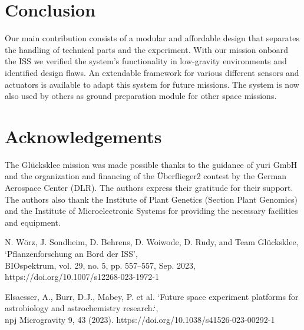 \documentclass{scrartcl}
\begin{document}
\section*{Conclusion}
Our main contribution consists of a modular and affordable design that separates the handling of technical parts and the experiment.
With our mission onboard the ISS we verified the system's functionality in low-gravity environments and identified design flaws.
An extendable framework for various different sensors and actuators is available to adapt this system for future missions.
The system is now also used by others as ground preparation module for other space missions.


\section*{Acknowledgements}
The Glücksklee mission was made possible thanks to the guidance of yuri GmbH and the organization and financing of the Überflieger2 contest by the German Aerospace Center (DLR). The authors express their gratitude for their support.
The authors also thank the Institute of Plant Genetics (Section Plant Genomics) and the Institute of Microelectronic Systems for providing the necessary facilities and equipment.


\begin{thebibliography}{99}
       N. Wörz, J. Sondheim, D. Behrens, D. Woiwode, D. Rudy, and Team Glücksklee, ‘Pflanzenforschung an Bord der ISS’, \\ BIOspektrum, vol. 29, no. 5, pp. 557–557, Sep. 2023, https://doi.org/10.1007/s12268-023-1972-1

       Elsaesser, A., Burr, D.J., Mabey, P. et al. ‘Future space experiment platforms for astrobiology and astrochemistry research.‘, \\npj Microgravity 9, 43 (2023). https://doi.org/10.1038/s41526-023-00292-1
\end{thebibliography}
\end{document}
